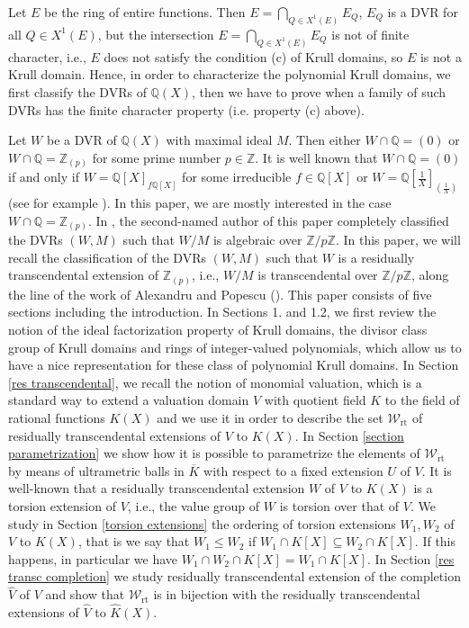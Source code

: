 \documentclass[10pt]{article}
\numberwithin{equation}{section}
\theoremstyle{definition}
\theoremstyle{definition}
\newcommand{\Q}{\mathbb{Q}}
\newcommand{\olK}{\overline{K}}
\newcommand{\K}{\widehat{K}}
\newcommand{\V}{\widehat{V}}
\newcommand{\rt}{\text{rt}}
\begin{document}
 Let $E$ be the ring of entire functions. Then $E = \bigcap\limits_{Q \in X^1(E)}E_Q$,
$E_Q$ is a DVR for all $Q \in X^1(E)$, but the intersection $E = \bigcap\limits_{Q \in X^1(E)}E_Q$
is not of finite character, i.e., $E$ does not satisfy the condition (c) of Krull domains,
so $E$ is not a Krull domain. Hence, in order to characterize the polynomial Krull domains, we
first classify the DVRs of $\Q(X)$, then we have to prove when a family of such DVRs has the finite character property (i.e. property (c) above).

Let $W$ be a DVR of $\mathbb{Q}(X)$ with maximal ideal $M$. Then either $W \cap \mathbb{Q} = (0)$ or $W \cap \mathbb{Q} = \mathbb{Z}_{(p)}$
for some prime number $p \in \mathbb{Z}$. It is well known that $W \cap \mathbb{Q} = (0)$ if and only if
$W = \mathbb{Q}[X]_{f\mathbb{Q}[X]}$ for some irreducible $f \in \mathbb{Q}[X]$ or
$W = \mathbb{Q}[\frac{1}{X}]_{(\frac{1}{X})}$ (see for example \cite{Chevalley}). In this paper, we are
mostly interested in the case $W \cap \mathbb{Q} = \mathbb{Z}_{(p)}$.
In \cite{PerStacked}, the second-named author of this paper
completely classified the DVRs $(W,M)$ such that $W/M$ is algebraic over $\mathbb{Z}/p\mathbb{Z}$.
In this paper, we will recall the classification of the DVRs $(W,M)$ such that 
$W$ is a residually transcendental extension of $\mathbb{Z}_{(p)}$, i.e.,
$W/M$ is transcendental over $\mathbb{Z}/p\mathbb{Z}$, along the line of the work of Alexandru and Popescu (\cite{AlePop}).  
This paper consists of five sections including the introduction. 
In  Sections 1. and 1.2, we first review the notion of 
 the ideal factorization property of Krull domains,
the divisor class group of Krull domains and rings of integer-valued polynomials, which allow us to have a nice representation for these class of polynomial Krull domains.  In Section \ref{res transcendental},  we recall the notion of monomial valuation, which is a standard way to extend a valuation domain $V$ with quotient field $K$ to the field of rational functions $K(X)$ and we use it in order to describe the set $\mathcal W_{\rt}$ of residually transcendental extensions of $V$ to $K(X)$. In Section \ref{section parametrization} we show how it is possible to parametrize the elements of $\mathcal W_{\rt}$  by means of ultrametric balls in $\olK$ with respect to a fixed extension $U$ of $V$. It is well-known that a residually transcendental extension $W$ of $V$ to $K(X)$ is a torsion extension of $V$, i.e., the value group of $W$ is torsion over that of $V$. We  study in Section \ref{torsion extensions} the  ordering of torsion extensions $W_1, W_2$ of $V$ to $K(X)$, that is we say that  $W_1\leq W_2$ if $W_1\cap K[X]\subseteq W_2\cap K[X]$. If this happens, in particular we have $W_1 \cap W_2 \cap K[X] = W_1 \cap K[X]$. In Section \ref{res transc completion} we study residually transcendental extension of the completion $\V$ of $V$ and show that $\mathcal W_{\rt}$ is in bijection with the residually transcendental extensions of $\V$ to $\K(X)$.
\end{document}
